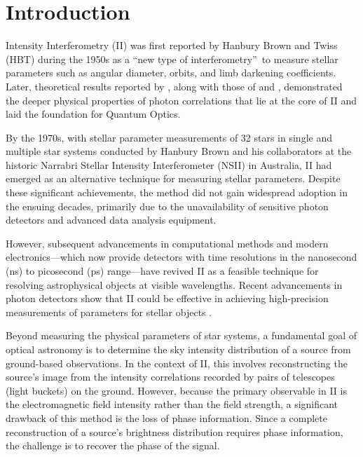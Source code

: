 \section{Introduction}

Intensity Interferometry (II) was first reported by Hanbury Brown and Twiss (HBT) during the 1950s \citep{brown1954lxxiv, HBT56} as a \textquotedblleft new type of interferometry\textquotedblright\ to measure stellar parameters such as angular diameter, orbits, and limb darkening coefficients. Later, theoretical results reported by \cite{brown1957interferometry, brown1958interferometry}, along with those of \cite{glauber1963quantum} and \cite{MandelWolf1995, Hecht2002}, demonstrated the deeper physical properties of photon correlations that lie at the core of II and laid the foundation for Quantum Optics.

By the 1970s, with stellar parameter measurements of 32 stars in single and multiple star systems conducted by Hanbury Brown and his collaborators \citep{hanbury1974angular} at the historic Narrabri Stellar Intensity Interferometer (NSII) in Australia, II had emerged as an alternative technique for measuring stellar parameters. Despite these significant achievements, the method did not gain widespread adoption in the ensuing decades, primarily due to the unavailability of sensitive photon detectors and advanced data analysis equipment.

However, subsequent advancements in computational methods and modern electronics—which now provide detectors with time resolutions in the nanosecond (ns) to picosecond (ps) range—have revived II as a feasible technique for resolving astrophysical objects at visible wavelengths. Recent advancements in photon detectors show that II could be effective in achieving high-precision measurements of parameters for stellar objects \citep{10.1093/mnras/stab2391, 10.1093/mnras/stac2433}.

Beyond measuring the physical parameters of star systems, a fundamental goal of optical astronomy is to determine the sky intensity distribution of a source from ground-based observations. In the context of II, this involves reconstructing the source's image from the intensity correlations recorded by pairs of telescopes (light buckets) on the ground. However, because the primary observable in II is the electromagnetic field intensity rather than the field strength, a significant drawback of this method is the loss of phase information. Since a complete reconstruction of a source's brightness distribution requires phase information, the challenge is to recover the phase of the signal.


